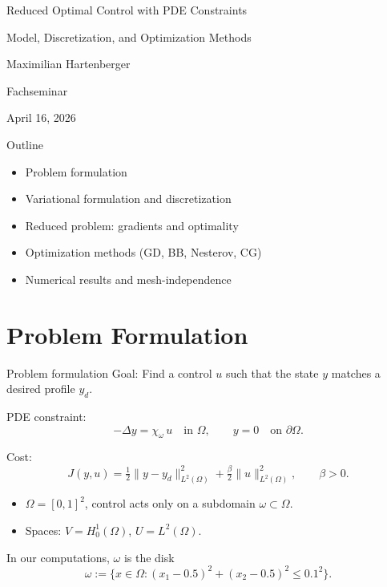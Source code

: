 \documentclass[aspectratio=169,11pt]{beamer}
\begin{document}
\begin{frame}
  \centering
  {\LARGE Reduced Optimal Control with PDE Constraints\par}
  \vspace{2mm}
  {\large Model, Discretization, and Optimization Methods\par}
  \vspace{2mm}
  {\normalsize Maximilian Hartenberger\par}
  \vspace{6mm}
  {\normalsize Fachseminar\par}
  \vspace{2mm}
  {\normalsize April 16, 2026\par}
\end{frame}

\begin{frame}{Outline}
\begin{itemize}
  \item Problem formulation
  \item Variational formulation and discretization
  \item Reduced problem: gradients and optimality
  \item Optimization methods (GD, BB, Nesterov, CG)
  \item Numerical results and mesh-independence
\end{itemize}
\end{frame}

\section{Problem Formulation}

\begin{frame}{Problem formulation}
Goal: Find a control $u$ such that the state $y$ matches a desired profile $y_d$.

\medskip
PDE constraint:
\[
  -\Delta y = \chi_{\omega}\,u \quad \text{in }\Omega,\qquad y=0\quad\text{on }\partial\Omega.
\]

Cost:
\[
  J(y,u)=\tfrac12\|y-y_d\|_{L^2(\Omega)}^2+\tfrac{\beta}{2}\|u\|_{L^2(\Omega)}^2,\qquad \beta>0.
\]

\begin{itemize}
  \item $\Omega=[0,1]^2$, control acts only on a subdomain $\omega\subset\Omega$.
  \item Spaces: $V=H_0^1(\Omega)$, $U=L^2(\Omega)$.
\end{itemize}

In our computations, $\omega$ is the disk
\[
  \omega := \big\{x\in\Omega : (x_1-0.5)^2+(x_2-0.5)^2 \le 0.1^2\big\}.
\]
\end{frame}
\end{document}
